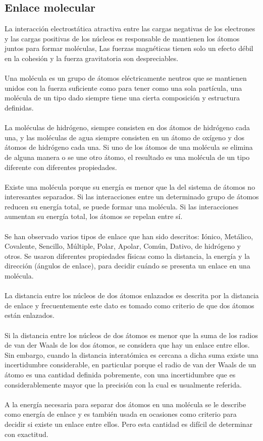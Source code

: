 \documentclass[12pt]{article}
\begin{document}
          \subsection{Enlace molecular}\label{sec:Enlace molecular}
               La interacción electrostática atractiva entre las cargas negativas de los electrones y las cargas positivas de los núcleos es responsable de mantienen los átomos juntos para formar moléculas, Las fuerzas magnéticas tienen solo un efecto débil en la cohesión y la fuerza gravitatoria son despreciables.\\\\
               Una molécula es un grupo de átomos eléctricamente neutros que se mantienen unidos con la fuerza suficiente como para tener como una sola partícula, una molécula de un tipo dado siempre tiene una cierta composición y estructura definidas.\\\\
               La moléculas de hidrógeno, siempre consisten en dos átomos de hidrógeno cada una, y las moléculas de agua siempre consisten en un átomo de oxígeno y dos átomos de hidrógeno cada una. Si uno de los átomos de una molécula se elimina de alguna manera o se une otro átomo, el resultado es una molécula de un tipo diferente con diferentes propiedades.\\\\
               Existe una molécula porque su energía es menor que la del sistema de átomos no interesantes separados. Si las interacciones entre un determinado grupo de átomos reducen su energía total, se puede formar una molécula. Si las interacciones aumentan su energía total, los átomos se repelan entre sí.\\\\
               Se han observado varios tipos de enlace que han sido descritos: Iónico, Metálico, Covalente, Sencillo, Múltiple, Polar, Apolar, Común, Dativo, de hidrógeno y otros. Se usaron diferentes propiedades físicas como la distancia, la energía y la dirección (ángulos de enlace), para decidir cuándo se presenta un enlace en una molécula.\\\\
               La distancia entre los núcleos de dos átomos enlazados es descrita por la distancia de enlace y frecuentemente este dato es tomado como criterio de que dos átomos están enlazados.\\\\
               Si la distancia entre los núcleos de dos átomos es menor que la suma de los radios de van der Waals de los dos átomos, se considera que hay un enlace entre ellos. Sin embargo, cuando la distancia interatómica es cercana a dicha suma existe una incertidumbre considerable, en particular porque el radio de van der Waals de un átomo es una cantidad definida pobremente, con una incertidumbre que es considerablemente mayor que la precisión con la cual es usualmente referida.\\\\
               A la energía necesaria para separar dos átomos en una molécula se le describe como energía de enlace y es también usada en ocasiones como criterio para decidir si existe un enlace entre ellos. Pero esta cantidad es difícil de determinar con exactitud.
\end{document}
